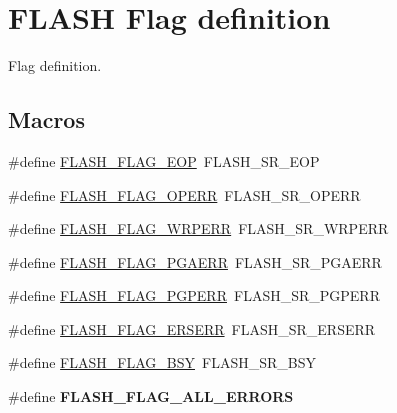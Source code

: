 \hypertarget{group___f_l_a_s_h___flag__definition}{}\section{F\+L\+A\+SH Flag definition}
\label{group___f_l_a_s_h___flag__definition}


Flag definition.  


\subsection*{Macros}
\begin{DoxyCompactItemize}
\item 
\#define \mbox{\hyperlink{group___f_l_a_s_h___flag__definition_gaf043ba4d8f837350bfc7754a99fae5a9}{F\+L\+A\+S\+H\+\_\+\+F\+L\+A\+G\+\_\+\+E\+OP}}~F\+L\+A\+S\+H\+\_\+\+S\+R\+\_\+\+E\+OP
\item 
\#define \mbox{\hyperlink{group___f_l_a_s_h___flag__definition_gad8a96ceda91fcf0d1299da933b5816f1}{F\+L\+A\+S\+H\+\_\+\+F\+L\+A\+G\+\_\+\+O\+P\+E\+RR}}~F\+L\+A\+S\+H\+\_\+\+S\+R\+\_\+\+O\+P\+E\+RR
\item 
\#define \mbox{\hyperlink{group___f_l_a_s_h___flag__definition_ga6abf64f916992585899369166db3f266}{F\+L\+A\+S\+H\+\_\+\+F\+L\+A\+G\+\_\+\+W\+R\+P\+E\+RR}}~F\+L\+A\+S\+H\+\_\+\+S\+R\+\_\+\+W\+R\+P\+E\+RR
\item 
\#define \mbox{\hyperlink{group___f_l_a_s_h___flag__definition_ga2c3f4dbea065f8ea2987eada4dab30bd}{F\+L\+A\+S\+H\+\_\+\+F\+L\+A\+G\+\_\+\+P\+G\+A\+E\+RR}}~F\+L\+A\+S\+H\+\_\+\+S\+R\+\_\+\+P\+G\+A\+E\+RR
\item 
\#define \mbox{\hyperlink{group___f_l_a_s_h___flag__definition_ga88a93907641f5eeb4091a26b84c94897}{F\+L\+A\+S\+H\+\_\+\+F\+L\+A\+G\+\_\+\+P\+G\+P\+E\+RR}}~F\+L\+A\+S\+H\+\_\+\+S\+R\+\_\+\+P\+G\+P\+E\+RR
\item 
\#define \mbox{\hyperlink{group___f_l_a_s_h___flag__definition_ga8b255e715e5d03fa00356a16f0980d91}{F\+L\+A\+S\+H\+\_\+\+F\+L\+A\+G\+\_\+\+E\+R\+S\+E\+RR}}~F\+L\+A\+S\+H\+\_\+\+S\+R\+\_\+\+E\+R\+S\+E\+RR
\item 
\#define \mbox{\hyperlink{group___f_l_a_s_h___flag__definition_gad3bc368f954ad7744deda3315da2fff7}{F\+L\+A\+S\+H\+\_\+\+F\+L\+A\+G\+\_\+\+B\+SY}}~F\+L\+A\+S\+H\+\_\+\+S\+R\+\_\+\+B\+SY
\item 
\#define {\bfseries F\+L\+A\+S\+H\+\_\+\+F\+L\+A\+G\+\_\+\+A\+L\+L\+\_\+\+E\+R\+R\+O\+RS}
\end{DoxyCompactItemize}


